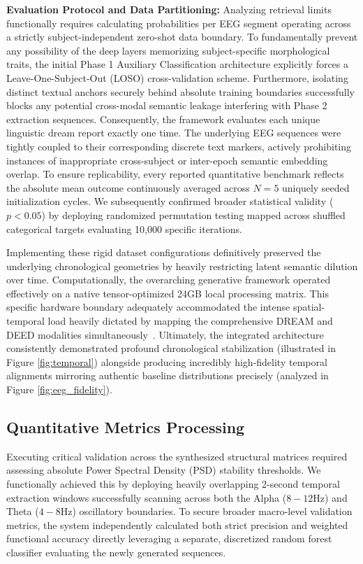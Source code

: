 \documentclass[journal]{IEEEtran}
\begin{document}
\indent \textbf{Evaluation Protocol and Data Partitioning:} Analyzing retrieval limits functionally requires calculating probabilities per EEG segment operating across a strictly subject-independent zero-shot data boundary. To fundamentally prevent any possibility of the deep layers memorizing subject-specific morphological traits, the initial Phase 1 Auxiliary Classification architecture explicitly forces a Leave-One-Subject-Out (LOSO) cross-validation scheme. Furthermore, isolating distinct textual anchors securely behind absolute training boundaries successfully blocks any potential cross-modal semantic leakage interfering with Phase 2 extraction sequences. Consequently, the framework evaluates each unique linguistic dream report exactly one time. The underlying EEG sequences were tightly coupled to their corresponding discrete text markers, actively prohibiting instances of inappropriate cross-subject or inter-epoch semantic embedding overlap. To ensure replicability, every reported quantitative benchmark reflects the absolute mean outcome continuously averaged across $N=5$ uniquely seeded initialization cycles. We subsequently confirmed broader statistical validity ($p < 0.05$) by deploying randomized permutation testing mapped across shuffled categorical targets evaluating 10,000 specific iterations.

Implementing these rigid dataset configurations definitively preserved the underlying chronological geometries by heavily restricting latent semantic dilution over time. Computationally, the overarching generative framework operated effectively on a native tensor-optimized 24GB local processing matrix. This specific hardware boundary adequately accommodated the intense spatial-temporal load heavily dictated by mapping the comprehensive DREAM and DEED modalities simultaneously~\cite{11154007}. Ultimately, the integrated architecture consistently demonstrated profound chronological stabilization (illustrated in Figure \ref{fig:temporal}) alongside producing incredibly high-fidelity temporal alignments mirroring authentic baseline distributions precisely (analyzed in Figure \ref{fig:eeg_fidelity}).

\subsection{Quantitative Metrics Processing}
Executing critical validation across the synthesized structural matrices required assessing absolute Power Spectral Density (PSD) stability thresholds. We functionally achieved this by deploying heavily overlapping 2-second temporal extraction windows successfully scanning across both the Alpha ($8-12$Hz) and Theta ($4-8$Hz) oscillatory boundaries. To secure broader macro-level validation metrics, the system independently calculated both strict precision and weighted functional accuracy directly leveraging a separate, discretized random forest classifier evaluating the newly generated sequences.
\end{document}
